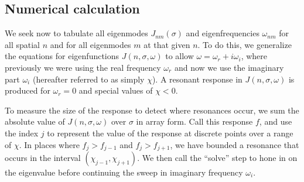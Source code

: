 \documentclass{aastex63}
\begin{document}
\subsection{Numerical calculation}

We seek now to tabulate all eigenmodes $J_{nm}(\sigma)$ and eigenfrequencies $\omega_{nm}$ for all spatial $n$ and for all eigenmodes $m$ at that given $n$. To do this, we generalize the equations for eigenfunctions $J(n,\sigma,\omega)$ to allow $\omega = \omega_r + i \omega_i$, where previously we were using the real frequency $\omega_r$ and now we use the imaginary part $\omega_i$ (hereafter referred to as simply $\chi$). A resonant response in $J(n,\sigma,\omega)$ is produced for $\omega_r=0$ and special values of $\chi<0$.

To measure the size of the response to detect where resonances occur, we sum the absolute value of $J(n,\sigma,\omega)$ over $\sigma$ in array form. Call this response $f$, and use the index $j$ to represent the value of the response at discrete points over a range of $\chi$. In places where $f_j > f_{j-1}$ and $f_j>f_{j+1}$, we have bounded a resonance that occurs in the interval $(\chi_{j-1},\chi_{j+1})$. We then call the ``solve'' step to hone in on the eigenvalue before continuing the sweep in imaginary frequency $\omega_i$.
\end{document}
